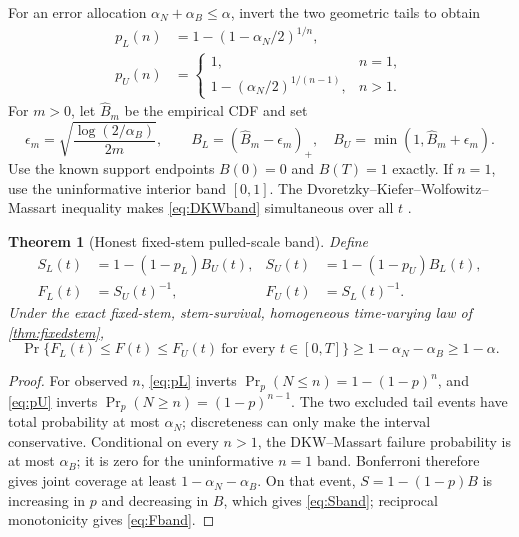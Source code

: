 \documentclass[11pt]{article}
\newtheorem{theorem}{Theorem}
\theoremstyle{definition}
\begin{document}
For an error allocation $\alpha_N+\alpha_B\leq\alpha$, invert the two geometric tails to obtain
\begin{align}
 p_L(n)&=1-(1-\alpha_N/2)^{1/n}, \label{eq:pL}\\
 p_U(n)&=\begin{cases}
 1,&n=1,\\
 1-(\alpha_N/2)^{1/(n-1)},&n>1.
 \end{cases} \label{eq:pU}
\end{align}
For $m>0$, let $\widehat B_m$ be the empirical CDF and set
\begin{equation}
 \epsilon_m=\sqrt{\frac{\log(2/\alpha_B)}{2m}},\qquad
 B_L=(\widehat B_m-\epsilon_m)_+,\quad
 B_U=\min(1,\widehat B_m+\epsilon_m). \label{eq:DKWband}
\end{equation}
Use the known support endpoints $B(0)=0$ and $B(T)=1$ exactly. If $n=1$, use the uninformative interior band $[0,1]$. The Dvoretzky--Kiefer--Wolfowitz--Massart inequality makes \eqref{eq:DKWband} simultaneous over all $t$ \parencite{massart1990}.

\begin{theorem}[Honest fixed-stem pulled-scale band]\label{thm:signalband}
Define
\begin{align}
 S_L(t)&=1-(1-p_L)B_U(t),&S_U(t)&=1-(1-p_U)B_L(t), \label{eq:Sband}\\
 F_L(t)&=S_U(t)^{-1},&F_U(t)&=S_L(t)^{-1}. \label{eq:Fband}
\end{align}
Under the exact fixed-stem, stem-survival, homogeneous time-varying law of \cref{thm:fixedstem},
\begin{equation}
 \Pr\{F_L(t)\leq F(t)\leq F_U(t)\ \text{for every }t\in[0,T]\}
 \geq1-\alpha_N-\alpha_B\geq1-\alpha. \label{eq:Fcoverage}
\end{equation}
\end{theorem}

\begin{proof}
For observed $n$, \eqref{eq:pL} inverts $\Pr_p(N\leq n)=1-(1-p)^n$, and \eqref{eq:pU} inverts $\Pr_p(N\geq n)=(1-p)^{n-1}$. The two excluded tail events have total probability at most $\alpha_N$; discreteness can only make the interval conservative. Conditional on every $n>1$, the DKW--Massart failure probability is at most $\alpha_B$; it is zero for the uninformative $n=1$ band. Bonferroni therefore gives joint coverage at least $1-\alpha_N-\alpha_B$. On that event, $S=1-(1-p)B$ is increasing in $p$ and decreasing in $B$, which gives \eqref{eq:Sband}; reciprocal monotonicity gives \eqref{eq:Fband}.
\end{proof}
\end{document}
